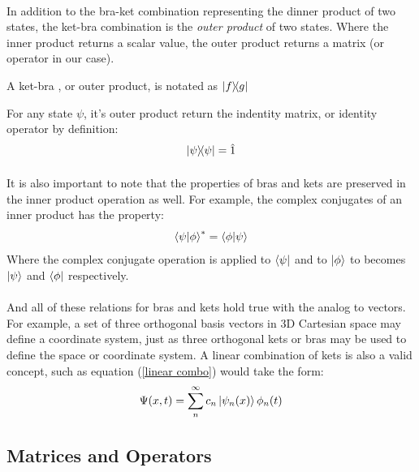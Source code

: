 \documentclass[12pt,letterpaper]{book}
\begin{document}
\paragraph*{}In addition to the bra-ket combination representing the dinner product of two states, the ket-bra combination is the \textit{outer product} of two states. Where the inner product returns a scalar value, the outer product returns a matrix (or operator in our case). 
\begin{center}
A ket-bra , or outer product, is notated as $\ketbra{f}{g}$
\end{center}
For any state $\psi$, it's outer product return the indentity matrix, or identity operator by definition:
\begin{equation}
\label{outer product}
\ketbra{\psi}{\psi} = \hat{1}
\end{equation}

\paragraph*{}It is also important to note that the properties of bras and kets are preserved in the inner product operation as well. For example, the complex conjugates of an inner product has the property:
\begin{equation}
\braket{\psi}{\phi}^* = \braket{\phi}{\psi} 
\end{equation}
Where the complex conjugate operation is applied to $\bra{\psi}$ and to $\ket{\phi}$ to becomes $\ket{\psi}$ and $\bra{\phi}$ respectively.
\paragraph*{}And all of these relations for bras and kets hold true with the analog to vectors. For example, a set of three orthogonal basis vectors in 3D Cartesian space may define a coordinate system, just as three orthogonal kets or bras may be used to define the space or coordinate system. A linear combination of kets is also a valid concept, such as equation (\ref{linear combo}) would take the form:
\begin{equation}
\label{linear combo kets}
\Psi(x,t) = \sum_n^{\infty} c_n \ket{\psi_n(x)}\phi_n(t)
\end{equation}


\subsection*{Matrices and Operators}
\end{document}
